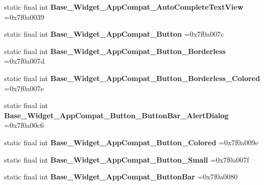 \begin{DoxyCompactItemize}
\mbox{\label{classproject4_1_1xaria_1_1R_1_1style_abc4947e8034f51d3e1f9ab0e5a1d899b}} 
static final int {\bfseries Base\+\_\+\+Widget\+\_\+\+App\+Compat\+\_\+\+Auto\+Complete\+Text\+View} =0x7f0a0039
\item 
\mbox{\label{classproject4_1_1xaria_1_1R_1_1style_a199e7faacb8f8a1b5f26ab8bd385d78b}} 
static final int {\bfseries Base\+\_\+\+Widget\+\_\+\+App\+Compat\+\_\+\+Button} =0x7f0a007c
\item 
\mbox{\label{classproject4_1_1xaria_1_1R_1_1style_a7bb686a0a99d073cf0004ef9eb13419d}} 
static final int {\bfseries Base\+\_\+\+Widget\+\_\+\+App\+Compat\+\_\+\+Button\+\_\+\+Borderless} =0x7f0a007d
\item 
\mbox{\label{classproject4_1_1xaria_1_1R_1_1style_a573a79c4f730789d79d3a3400afd9c29}} 
static final int {\bfseries Base\+\_\+\+Widget\+\_\+\+App\+Compat\+\_\+\+Button\+\_\+\+Borderless\+\_\+\+Colored} =0x7f0a007e
\item 
\mbox{\label{classproject4_1_1xaria_1_1R_1_1style_abe5ce8ce12cb77c8a612581d0c1bafa6}} 
static final int {\bfseries Base\+\_\+\+Widget\+\_\+\+App\+Compat\+\_\+\+Button\+\_\+\+Button\+Bar\+\_\+\+Alert\+Dialog} =0x7f0a00c6
\item 
\mbox{\label{classproject4_1_1xaria_1_1R_1_1style_ad40926e065fe557485698ac79e30b112}} 
static final int {\bfseries Base\+\_\+\+Widget\+\_\+\+App\+Compat\+\_\+\+Button\+\_\+\+Colored} =0x7f0a009e
\item 
\mbox{\label{classproject4_1_1xaria_1_1R_1_1style_adf60155177fbb0e70ed550a31c522a44}} 
static final int {\bfseries Base\+\_\+\+Widget\+\_\+\+App\+Compat\+\_\+\+Button\+\_\+\+Small} =0x7f0a007f
\item 
\mbox{\label{classproject4_1_1xaria_1_1R_1_1style_a05f9f482c2c70ab310862b2a0b2bc2a0}} 
static final int {\bfseries Base\+\_\+\+Widget\+\_\+\+App\+Compat\+\_\+\+Button\+Bar} =0x7f0a0080
\item 

\end{DoxyCompactItemize}
